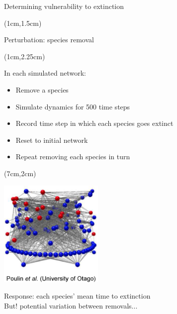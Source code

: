 \documentclass{beamer}
\newcommand*\whitem{%
  \item[\color{white}\scalebox{0.9}{\textbullet}]}
\begin{document}
  \begin{frame}{Determining vulnerability to extinction}
    \begin{textblock*}{7cm}(1cm,1.5cm)

      {\color{DarkBlue}Perturbation: species removal}

    \end{textblock*}

    \begin{textblock*}{5cm}(1cm,2.25cm)

      {\color{DarkBlue}In each simulated network:}

      \begin{itemize}
        \item Remove a species
        \item Simulate dynamics for 500 time steps
        \item Record time step in which each species goes extinct
        \item Reset to initial network
        \whitem {\color{white}Repeat removing each species in turn}

      \end{itemize}

      \end{textblock*}

    \begin{textblock*}{5cm}(7cm,2cm)

      \includegraphics[width=5cm]{intro_figs/Otagoweb_minimal.eps}

      \end{textblock*}




    {\color{white} Response: each species' mean time to extinction\\
    But! potential variation between removals...}

    \end{frame}
\end{document}
